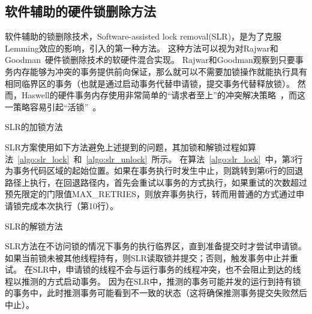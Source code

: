 \subsection{软件辅助的硬件锁删除方法}
软件辅助的锁删除技术，Software-assisted lock removal(SLR)，是为了克服Lemming效应的影响，引入的第一种方法。
这种方法可以视为对Rajwar和Goodman~\cite{Rajwar2002Transactional}硬件锁删除技术的软硬件混合实现。
Rajwar和Goodman观察到只要事务内存能够为冲突的事务提供前向保证，那么就可以不需要加锁操作就能执行具有相同临界区的事务（也就是通过启动事务代替申请锁，提交事务代替释放锁）。
然而，Haswell的硬件事务内存使用非常简单的“请求者至上”的冲突解决策略~\cite{2011Intel}，而这一策略容易引起“活锁”~\cite{Bobba2007Performance}。

\begin{algorithm}[htbp]
\SetAlgoLined
{}
\caption{SLR的加锁方法}
\label{algo:slr_lock}
\end{algorithm}

SLR方案使用如下方法避免上述提到的问题，其加锁和解锁过程如算法~\ref{algo:slr_lock}~和~\ref{algo:slr_unlock}~所示。
在算法~\ref{algo:slr_lock}~中，第3行为事务代码区域的起始位置。如果在事务执行时发生中止，则跳转到第6行的回退路径上执行，在回退路径内，首先会重试以事务的方式执行，如果重试的次数超过预先限定的门限值MAX\_RETRIES，则放弃事务执行，转而用普通的方式通过申请锁完成本次执行（第10行）。

\begin{algorithm}[htbp]
\SetAlgoLined
{}
\caption{SLR的解锁方法}
\label{algo:slr_unlock}
\end{algorithm}

SLR方法在不访问锁的情况下事务的执行临界区，直到准备提交时才尝试申请锁。
如果当前锁未被其他线程持有，则SLR读取锁并提交；否则，触发事务中止并重试。
在SLR中，申请锁的线程不会与运行事务的线程冲突，也不会阻止到达的线程以推测的方式启动事务。
因为在SLR中，推测的事务可能并发的运行到持有锁的事务中，此时推测事务可能看到不一致的状态（这将确保推测事务提交失败然后中止）。


